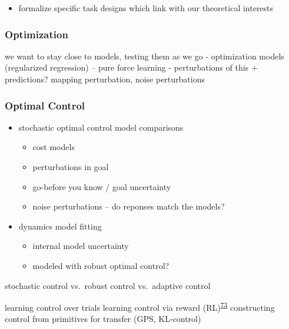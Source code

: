 \documentclass[
  a4paper,
]{article}
\providecommand{\tightlist}{%
  \setlength{\itemsep}{0pt}\setlength{\parskip}{0pt}}
\begin{document}
\begin{itemize}
\tightlist
\item
  formalize specific task designs which link with our theoretical
  interests
\end{itemize}

\hypertarget{optimization}{%
\subsubsection{Optimization}\label{optimization}}

we want to stay close to models, testing them as we go - optimization
models (regularized regression) -- pure force learning - perturbations
of this + predictions? mapping perturbation, noise perturbations

\hypertarget{optimal-control}{%
\subsubsection{Optimal Control}\label{optimal-control}}

\begin{itemize}
\tightlist
\item
  stochastic optimal control model comparisons

  \begin{itemize}
  \tightlist
  \item
    cost models
  \item
    perturbations in goal
  \item
    go-before you know / goal uncertainty
  \item
    noise perturbations -- do reponses match the models?
  \end{itemize}
\item
  dynamics model fitting

  \begin{itemize}
  \tightlist
  \item
    internal model uncertainty
  \item
    modeled with robust optimal control?
  \end{itemize}
\end{itemize}

stochastic control vs.~robust control vs.~adaptive control

learning control over trials learning control via reward
(RL)\textsuperscript{\protect\hyperlink{ref-vanderkooijLearningReachTrajectory2021}{73}}
constructing control from primitives for transfer (GPS, KL-control)
\end{document}
